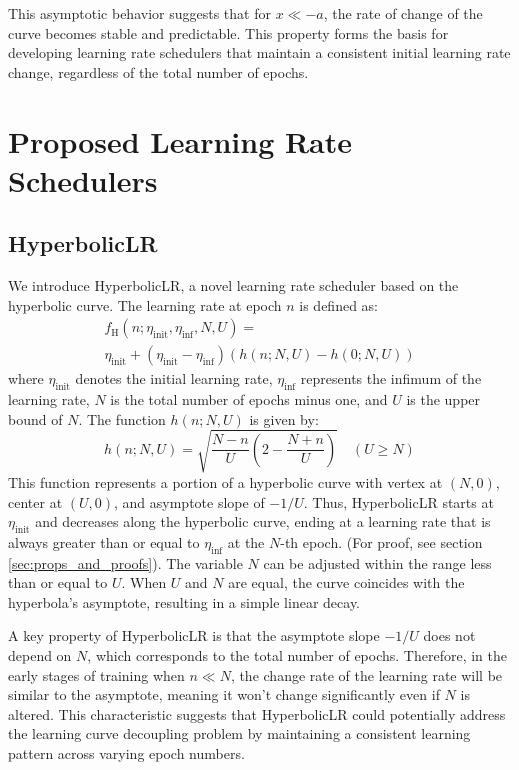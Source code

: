 \documentclass{article}
\theoremstyle{plain}
\theoremstyle{definition}
\theoremstyle{remark}
\begin{document}
This asymptotic behavior suggests that for $x \ll -a$, the rate of change of the curve becomes stable and predictable.
This property forms the basis for developing learning rate schedulers that maintain a consistent initial learning rate change, regardless of the total number of epochs.

\section{Proposed Learning Rate Schedulers}
\label{sec:proposed}

\subsection{HyperbolicLR}
\label{subsec:hyperboliclr}

We introduce HyperbolicLR, a novel learning rate scheduler based on the hyperbolic curve.
The learning rate at epoch $n$ is defined as:
\begin{multline}
   f_\text{H}(n; \eta_\text{init}, \eta_\text{inf}, N, U) = \\ \eta_\text{init} + (\eta_\text{init} - \eta_\text{inf}) (h(n; N, U) - h(0; N, U))
   \label{eq:hyperbolic_lr}
\end{multline}
where $\eta_\text{init}$ denotes the initial learning rate, $\eta_\text{inf}$ represents the infimum of the learning rate, $N$ is the total number of epochs minus one, and $U$ is the upper bound of $N$.
The function $h(n; N, U)$ is given by:
\begin{equation}
   h(n; N, U) = \sqrt{\frac{N - n}{U} \left(2 - \frac{N + n}{U}\right)} \quad (U \geq N)
\end{equation}
This function represents a portion of a hyperbolic curve with vertex at $(N, 0)$, center at $(U, 0)$, and asymptote slope of $-1/U$.
Thus, HyperbolicLR starts at $\eta_\text{init}$ and decreases along the hyperbolic curve, ending at a learning rate that is always greater than or equal to $\eta_\text{inf}$ at the $N$-th epoch. (For proof, see section \ref{sec:props_and_proofs}).
The variable $N$ can be adjusted within the range less than or equal to $U$. 
When $U$ and $N$ are equal, the curve coincides with the hyperbola's asymptote, resulting in a simple linear decay.

A key property of HyperbolicLR is that the asymptote slope $-1/U$ does not depend on $N$, which corresponds to the total number of epochs.
Therefore, in the early stages of training when $n \ll N$, the change rate of the learning rate will be similar to the asymptote, meaning it won't change significantly even if $N$ is altered.
This characteristic suggests that HyperbolicLR could potentially address the learning curve decoupling problem by maintaining a consistent learning pattern across varying epoch numbers.
\end{document}
